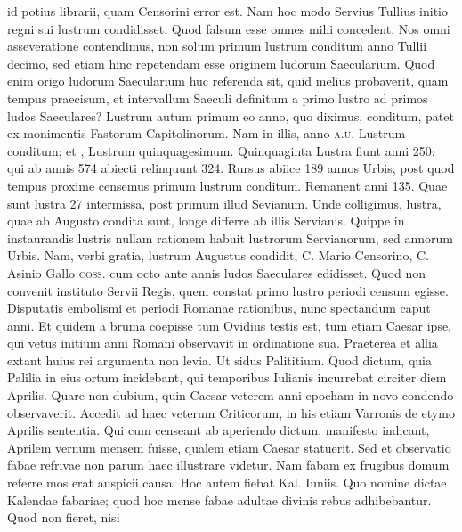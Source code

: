 id potius librarii,
quam Censorini
error est.
Nam
hoc modo Servius
Tullius initio regni
sui lustrum condidisset.
Quod falsum esse
omnes mihi concedent.
Nos omni asseveratione
contendimus,
non solum primum
lustrum conditum
anno Tullii decimo,
sed etiam hinc
repetendam esse originem
ludorum Saecularium.
Quod enim
origo ludorum Saecularium
huc referenda
sit, quid melius probaverit,
quam tempus praecisum, et intervallum Saeculi definitum a
primo lustro ad primos ludos Saeculares?
%
Lustrum autum primum eo
anno, quo diximus, conditum, patet ex monimentis Fastorum Capitolinorum.
Nam in illis, anno \textsc{a.u.}  Lustrum 
 conditum;
et , Lustrum quinquagesimum.
Quinquaginta
Lustra fiunt anni 250: qui ab annis 574 abiecti relinquunt 324.
Rursus abiice 189 annos Urbis, post quod tempus proxime censemus
primum lustrum conditum.
Remanent anni 135.
Quae sunt lustra
27 intermissa, post primum illud Sevianum.
Unde colligimus,
lustra, quae ab Augusto condita sunt, longe differre ab illis Servianis.
Quippe in instaurandis lustris nullam rationem habuit lustrorum
Servianorum, sed annorum Urbis.
Nam, verbi gratia, lustrum
Augustus condidit, C. Mario Censorino, C. Asinio Gallo \textsc{coss.}
cum octo ante annis ludos Saeculares edidisset.
Quod non convenit
instituto
Servii Regis, quem constat primo lustro periodi censum
egisse.
Disputatis embolismi et periodi Romanae rationibus, nunc
spectandum caput anni.
Et quidem a bruma coepisse tum Ovidius
testis est, tum etiam Caesar ipse, qui vetus initium anni Romani
observavit in ordinatione sua.
Praeterea et allia extant huius rei argumenta
non levia.
Ut sidus Palititium.
Quod dictum, quia Palilia in
eius ortum incidebant, qui temporibus Iulianis incurrebat circiter
 diem Aprilis.
Quare non dubium, quin Caesar veterem anni
epocham in novo condendo observaverit.
Accedit ad haec veterum
Criticorum, in his etiam Varronis de etymo Aprilis sententia.
Qui
cum censeant ab aperiendo dictum, manifesto indicant, Aprilem
vernum mensem fuisse, qualem etiam Caesar statuerit.
Sed et observatio fabae
refrivae non parum haec illustrare videtur.
Nam fabam
ex frugibus domum referre mos erat auspicii causa.
Hoc autem fiebat
Kal. Iuniis. %
Quo nomine dictae Kalendae fabariae; quod hoc mense
fabae adultae divinis rebus adhibebantur.
Quod non fieret, nisi
